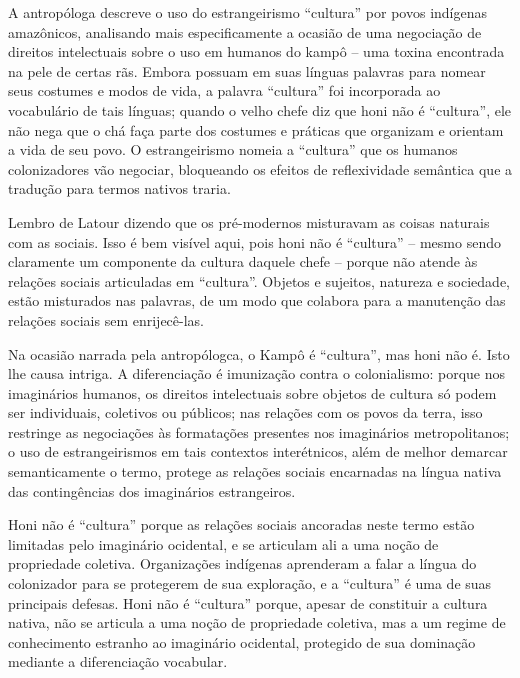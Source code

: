 A antropóloga descreve o uso do estrangeirismo \enquote{cultura} por povos indígenas amazônicos, analisando mais especificamente a ocasião de uma negociação de direitos intelectuais sobre o uso em humanos do kampô --  uma toxina encontrada na pele de certas rãs. Embora possuam em suas línguas palavras para nomear seus costumes e modos de vida, a palavra \enquote{cultura} foi incorporada ao vocabulário de tais línguas; quando o velho chefe diz que honi não é \enquote{cultura}, ele não nega que o chá faça parte dos costumes e práticas que organizam e orientam a vida de seu povo. O estrangeirismo nomeia a \enquote{cultura} que os humanos colonizadores vão negociar, bloqueando os efeitos de reflexividade semântica que a tradução para termos nativos traria.

Lembro de Latour dizendo que os pré-modernos misturavam as coisas naturais com as sociais. Isso é bem visível aqui, pois honi não é \enquote{cultura} -- mesmo sendo claramente um componente da cultura daquele chefe -- porque não atende às relações sociais articuladas em \enquote{cultura}. Objetos e sujeitos, natureza e sociedade, estão misturados nas palavras, de um modo que colabora para a manutenção das relações sociais sem enrijecê-las.

Na ocasião narrada pela antropólogca, o Kampô é \enquote{cultura}, mas honi não é. Isto lhe causa intriga. A diferenciação é imunização contra o colonialismo: porque nos imaginários humanos, os direitos intelectuais sobre objetos de cultura só podem ser individuais, coletivos ou públicos; nas relações com os povos da terra, isso restringe as negociações às formatações presentes nos imaginários metropolitanos; o uso de estrangeirismos em tais contextos interétnicos, além de melhor demarcar semanticamente o termo, protege as relações sociais encarnadas na língua nativa das contingências dos imaginários estrangeiros.

Honi não é \enquote{cultura} porque as relações sociais ancoradas neste termo estão limitadas pelo imaginário ocidental, e se articulam ali a uma noção de propriedade coletiva. Organizações indígenas aprenderam a falar a língua do colonizador para se protegerem de sua exploração, e a \enquote{cultura} é uma de suas principais defesas. Honi não é \enquote{cultura} porque, apesar de constituir a cultura nativa, não se articula a uma noção de propriedade coletiva, mas a um regime de conhecimento estranho ao imaginário ocidental, protegido de sua dominação mediante a diferenciação vocabular.

